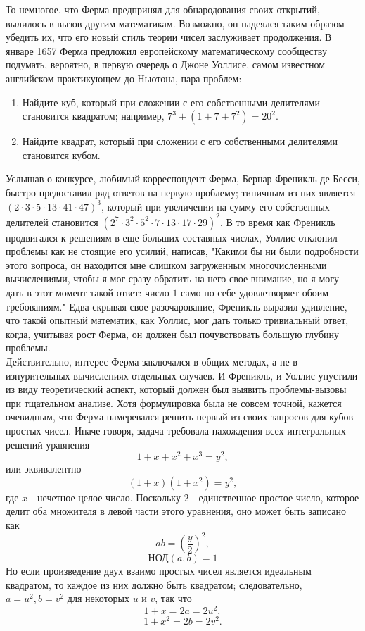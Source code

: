 \documentclass[11pt]{article}
\begin{document}
То немногое, что Ферма предпринял для обнародования своих открытий, вылилось в вызов другим математикам. Возможно, он надеялся таким образом убедить их, что его новый стиль теории чисел заслуживает продолжения. В январе 1657 Ферма предложил европейскому математическому сообществу подумать, вероятно, в первую очередь о Джоне Уоллисе, самом известном английском практикующем до Ньютона, пара проблем: 
\begin{enumerate}  
\item Найдите куб, который при сложении с его собственными делителями становится квадратом; например, $7^{3}+(1+7+7^{2})=20^{2}$.
\item Найдите квадрат, который при сложении с его собственными делителями становится кубом.
\end{enumerate}
Услышав о конкурсе, любимый корреспондент Ферма, Бернар Френикль де Бесси, быстро предоставил ряд ответов на первую проблему; типичным из них является $(2\cdot3\cdot5\cdot13\cdot41\cdot47)^{3}$, который при увеличении на сумму его собственных делителей становится $(2^{7}\cdot3^{2}\cdot5^{2}\cdot7\cdot13\cdot17\cdot29)^{2}$. В то время как Френикль продвигался к решениям в еще больших составных числах, Уоллис отклонил проблемы как не стоящие его усилий, написав, "Какими бы ни были подробности этого вопроса, он находится мне слишком загруженным многочисленными вычислениями, чтобы я мог сразу обратить на него свое внимание, но я могу дать в этот момент такой ответ: число $1$ само по себе удовлетворяет обоим требованиям." Едва скрывая свое разочарование, Френикль выразил удивление, что такой опытный математик, как Уоллис, мог дать только тривиальный ответ, когда, учитывая рост Ферма, он должен был почувствовать большую глубину проблемы.\\
Действительно, интерес Ферма заключался в общих методах, а не в изнурительных вычислениях отдельных случаев. И Френикль, и Уоллис упустили из виду теоретический аспект, который должен был выявить проблемы-вызовы при тщательном анализе. Хотя формулировка была не совсем точной, кажется очевидным, что Ферма намеревался решить первый из своих запросов для кубов простых чисел. Иначе говоря, задача требовала нахождения всех интегральных решений уравнения \[1+x+x^{2}+x^{3}=y^{2},\] 
или эквивалентно \[(1+x)(1+x^{2})=y^{2},\] 
где $x$ - нечетное целое число. Поскольку $2$ - единственное простое число, которое делит оба множителя в левой части этого уравнения, оно может быть записано как \[ ab=(\frac{y}{2})^{2},\] \[\text{НОД}(a,b)=1\]  
Но если произведение двух взаимо простых чисел является идеальным квадратом, то каждое из них должно быть квадратом; следовательно, $a=u^{2}, b=v^{2}$ для некоторых $u$ и $v$, так что \[1+x=2a=2u^{2},\] \[ 1+x^{2}=2b=2v^{2}.\] 
\end{document}
